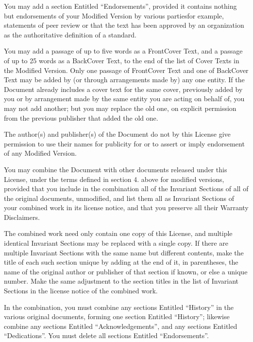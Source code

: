 \documentclass[letterpaper,10pt,english,openany,oneside]{sphinxmanual}
\begin{document}
\sphinxAtStartPar
You may add a section Entitled “Endorsements”, provided it contains
nothing but endorsements of your Modified Version by various
parties\textendash{}for example, statements of peer review or that the text has
been approved by an organization as the authoritative definition of a
standard.

\sphinxAtStartPar
You may add a passage of up to five words as a Front\sphinxhyphen{}Cover Text, and a
passage of up to 25 words as a Back\sphinxhyphen{}Cover Text, to the end of the list
of Cover Texts in the Modified Version. Only one passage of Front\sphinxhyphen{}Cover
Text and one of Back\sphinxhyphen{}Cover Text may be added by (or through arrangements
made by) any one entity. If the Document already includes a cover text
for the same cover, previously added by you or by arrangement made by
the same entity you are acting on behalf of, you may not add another;
but you may replace the old one, on explicit permission from the
previous publisher that added the old one.

\sphinxAtStartPar
The author(s) and publisher(s) of the Document do not by this License
give permission to use their names for publicity for or to assert or
imply endorsement of any Modified Version.

\sphinxAtStartPar
{}

\sphinxAtStartPar
You may combine the Document with other documents released under this
License, under the terms defined in section 4. above for
modified versions, provided that you include in the combination all of
the Invariant Sections of all of the original documents, unmodified, and
list them all as Invariant Sections of your combined work in its license
notice, and that you preserve all their Warranty Disclaimers.

\sphinxAtStartPar
The combined work need only contain one copy of this License, and
multiple identical Invariant Sections may be replaced with a single
copy. If there are multiple Invariant Sections with the same name but
different contents, make the title of each such section unique by adding
at the end of it, in parentheses, the name of the original author or
publisher of that section if known, or else a unique number. Make the
same adjustment to the section titles in the list of Invariant Sections
in the license notice of the combined work.

\sphinxAtStartPar
In the combination, you must combine any sections Entitled “History” in
the various original documents, forming one section Entitled “History”;
likewise combine any sections Entitled “Acknowledgements”, and any
sections Entitled “Dedications”. You must delete all sections Entitled
“Endorsements”.
\end{document}
